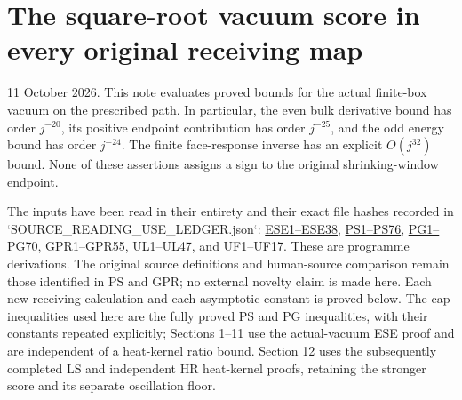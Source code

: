 \documentclass[11pt]{article}
\begin{document}
\section*{The square-root vacuum score in every original receiving map}

11 October 2026. This note evaluates proved bounds for the actual finite-box vacuum on the prescribed path. In particular, the even bulk derivative bound has order \(j^{-20}\), its positive endpoint contribution has order \(j^{-25}\), and the odd energy bound has order \(j^{-24}\). The finite face-response inverse has an explicit \(O(j^{32})\) bound. None of these assertions assigns a sign to the original shrinking-window endpoint.

The inputs have been read in their entirety and their exact file hashes recorded in `SOURCE\_READING\_USE\_LEDGER.json`: \href{https://github.com/KokunoYumeto/yang-mills-interacting-workbench/blob/main/yang-mills/continuations/20261011-central-signs-shrinking-window/CONDITIONAL_EDGE_ENTROPY_AND_SCORE.md}{ESE1–ESE38}, \href{https://github.com/KokunoYumeto/yang-mills-interacting-workbench/blob/442786391ab942ad0c829c0ebf32e952585915e0/yang-mills/continuations/20261011-central-signs-shrinking-window/POLYNOMIAL_SCORE_AND_ORIGINAL_ENDPOINT.md}{PS1–PS76}, \href{https://github.com/KokunoYumeto/yang-mills-interacting-workbench/blob/442786391ab942ad0c829c0ebf32e952585915e0/yang-mills/continuations/20261011-central-signs-shrinking-window/POLYNOMIAL_GRADIENT_BOUNDS.md}{PG1–PG70}, \href{https://github.com/KokunoYumeto/yang-mills-interacting-workbench/blob/442786391ab942ad0c829c0ebf32e952585915e0/yang-mills/continuations/20261011-central-signs-shrinking-window/GLOBAL_PHYSICAL_RESPONSE.md}{GPR1–GPR55}, \href{https://github.com/KokunoYumeto/yang-mills-interacting-workbench/blob/442786391ab942ad0c829c0ebf32e952585915e0/yang-mills/continuations/20261011-central-signs-shrinking-window/union_label_global/FULL_UNION_LABEL_INVERSE.md}{UL1–UL47}, and \href{https://github.com/KokunoYumeto/yang-mills-interacting-workbench/blob/442786391ab942ad0c829c0ebf32e952585915e0/yang-mills/continuations/20261011-central-signs-shrinking-window/SUPPORT_AND_SCALAR_FACTORIZATION.md}{UF1–UF17}. These are programme derivations. The original source definitions and human-source comparison remain those identified in PS and GPR; no external novelty claim is made here. Each new receiving calculation and each asymptotic constant is proved below. The cap inequalities used here are the fully proved PS and PG inequalities, with their constants repeated explicitly; Sections 1–11 use the actual-vacuum ESE proof and are independent of a heat-kernel ratio bound. Section 12 uses the subsequently completed LS and independent HR heat-kernel proofs, retaining the stronger score and its separate oscillation floor.
\end{document}
